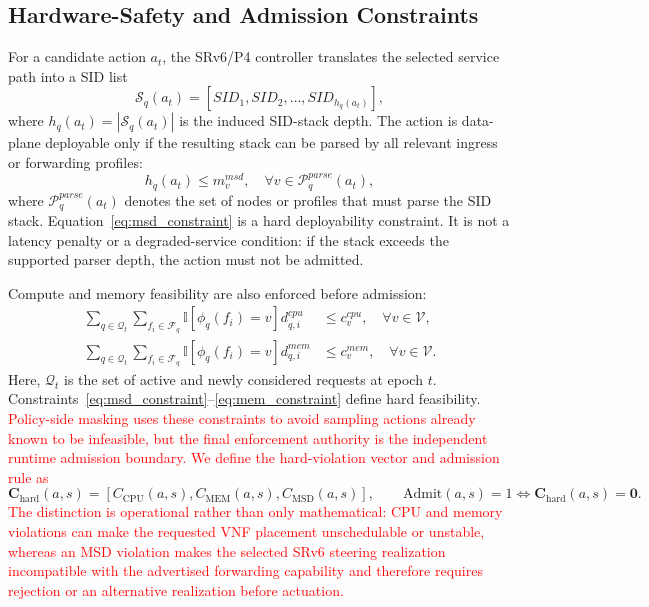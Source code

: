 \documentclass[final,5p]{elsarticle}
\newcommand{\rev}[1]{\textcolor{red}{#1}}
\newenvironment{revision}{\color{red}}{}
\begin{document}
\subsection{Hardware-Safety and Admission Constraints}
\label{subsec:hardware_constraint_model}

For a candidate action \(a_t\), the SRv6/P4 controller translates the selected service path into a SID list
\begin{equation}
    \mathcal{S}_q(a_t)=
    \left[SID_1,SID_2,\ldots,SID_{h_q(a_t)}\right],
\end{equation}
where \(h_q(a_t)=|\mathcal{S}_q(a_t)|\) is the induced SID-stack depth. The action is data-plane deployable only if the resulting stack can be parsed by all relevant ingress or forwarding profiles:
\begin{equation}
    h_q(a_t) \leq m_v^{msd},
    \quad
    \forall v\in\mathcal{P}^{parse}_q(a_t),
    \label{eq:msd_constraint}
\end{equation}
where \(\mathcal{P}^{parse}_q(a_t)\) denotes the set of nodes or profiles that must parse the SID stack. Equation~\eqref{eq:msd_constraint} is a hard deployability constraint. It is not a latency penalty or a degraded-service condition: if the stack exceeds the supported parser depth, the action must not be admitted.

Compute and memory feasibility are also enforced before admission:
\begin{align}
    \sum_{q\in\mathcal{Q}_t}
    \sum_{f_i\in\mathcal{F}_q}
    \mathbb{I}\!\left[\phi_q(f_i)=v\right] d_{q,i}^{cpu}
    &\leq c_v^{cpu},
    \quad \forall v\in\mathcal{V}, \label{eq:cpu_constraint}\\
    \sum_{q\in\mathcal{Q}_t}
    \sum_{f_i\in\mathcal{F}_q}
    \mathbb{I}\!\left[\phi_q(f_i)=v\right] d_{q,i}^{mem}
    &\leq c_v^{mem},
    \quad \forall v\in\mathcal{V}. \label{eq:mem_constraint}
\end{align}
Here, \(\mathcal{Q}_t\) is the set of active and newly considered requests at epoch \(t\). Constraints~\eqref{eq:msd_constraint}--\eqref{eq:mem_constraint} define hard feasibility. \rev{Policy-side masking uses these constraints to avoid sampling actions already known to be infeasible, but the final enforcement authority is the independent runtime admission boundary. We define the hard-violation vector and admission rule as}
\begin{revision}
\begin{equation}
\mathbf{C}_{\mathrm{hard}}(a,s)=\left[C_{\mathrm{CPU}}(a,s),C_{\mathrm{MEM}}(a,s),C_{\mathrm{MSD}}(a,s)\right], \qquad \mathrm{Admit}(a,s)=1 \Longleftrightarrow \mathbf{C}_{\mathrm{hard}}(a,s)=\mathbf{0}.
\label{eq:hard_admission_contract}
\end{equation}
\end{revision}
\rev{The distinction is operational rather than only mathematical: CPU and memory violations can make the requested VNF placement unschedulable or unstable, whereas an MSD violation makes the selected SRv6 steering realization incompatible with the advertised forwarding capability and therefore requires rejection or an alternative realization before actuation.}
\end{document}
